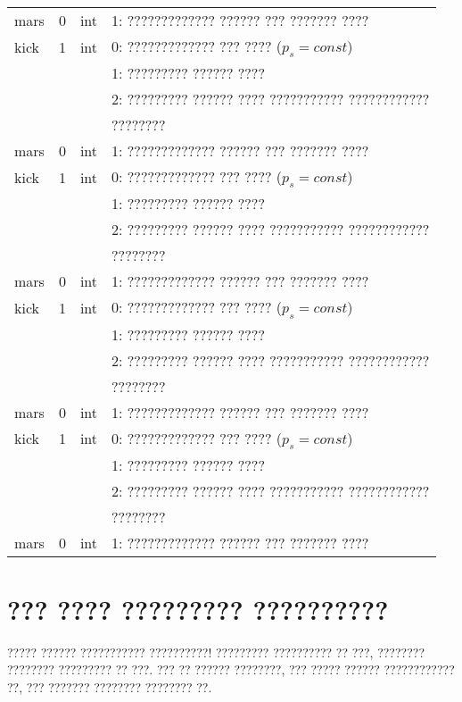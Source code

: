 \begin{longtable*}[c]{|l|c|l|l|}
    mars & 0 & int & 1: ????????????? ?????? ??? ??????? ????     \\
    kick & 1 & int & 0: ????????????? ??? ???? (\(p_s = const\)) \\
    &   &     & 1: ????????? ?????? ????                  \\
    &   &     & 2: ????????? ?????? ???? ??????????? ???????????? \\
    & & & ????????    \\
    mars & 0 & int & 1: ????????????? ?????? ??? ??????? ????     \\
    kick & 1 & int & 0: ????????????? ??? ???? (\(p_s = const\)) \\
    &   &     & 1: ????????? ?????? ????                  \\
    &   &     & 2: ????????? ?????? ???? ??????????? ???????????? \\
    & & & ????????    \\
    mars & 0 & int & 1: ????????????? ?????? ??? ??????? ????     \\
    kick & 1 & int & 0: ????????????? ??? ???? (\(p_s = const\)) \\
    &   &     & 1: ????????? ?????? ????                  \\
    &   &     & 2: ????????? ?????? ???? ??????????? ???????????? \\
    & & & ????????    \\
    mars & 0 & int & 1: ????????????? ?????? ??? ??????? ????     \\
    kick & 1 & int & 0: ????????????? ??? ???? (\(p_s = const\)) \\
    &   &     & 1: ????????? ?????? ????                  \\
    &   &     & 2: ????????? ?????? ???? ??????????? ???????????? \\
    & & & ????????    \\
    mars & 0 & int & 1: ????????????? ?????? ??? ??????? ????     \\
    \hline
\end{longtable*}

\normalsize%
\section{??? ???? ????????? ??????????}\label{app:B2}

????? ?????? ??????????? ??????????!
????????? ?????????? ?? ???, ???????? ???????? ????????? ?? ???. ??? ?? ??????
????????, ??? ????? ?????? ???????????? ??, ??? ??????? ???????? ???????? ??.

